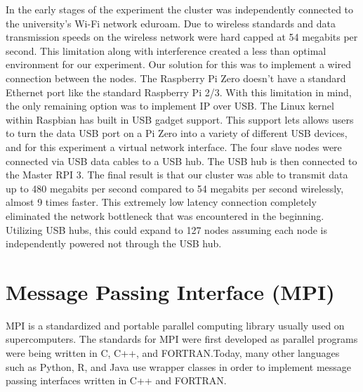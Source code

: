 	In the early stages of the experiment the cluster was independently connected to the university's Wi-Fi network eduroam. Due to wireless standards and data transmission speeds on the wireless network were hard capped at 54 megabits per second. This limitation along with interference created a less than optimal environment for our experiment. Our solution for this was to implement a wired connection between the nodes.
	The Raspberry Pi Zero doesn’t have a standard Ethernet port like the standard Raspberry Pi 2/3. With this limitation in mind, the only remaining option was to implement IP over USB. The Linux kernel within Raspbian has built in USB gadget support. This support lets allows users to turn the data USB port on a Pi Zero into a variety of different USB devices, and for this experiment a virtual network interface. The four slave nodes were connected via USB data cables to a USB hub. The USB hub is then connected to the Master RPI 3. 
	The final result is that our cluster was able to transmit data up to 480 megabits per second compared to 54 megabits per second wirelessly, almost 9 times faster. This extremely low latency connection completely eliminated the network bottleneck that was encountered in the beginning. Utilizing USB hubs, this could expand to 127 nodes assuming each node is independently powered not through the USB hub.

\section{Message Passing Interface (MPI)}

	MPI is a standardized and portable parallel computing library usually used on supercomputers. The standards for MPI were first developed as parallel programs were being written in C, C++, and FORTRAN.Today, many other languages such as Python, R, and Java use wrapper classes in order to implement message passing interfaces written in C++ and FORTRAN.

